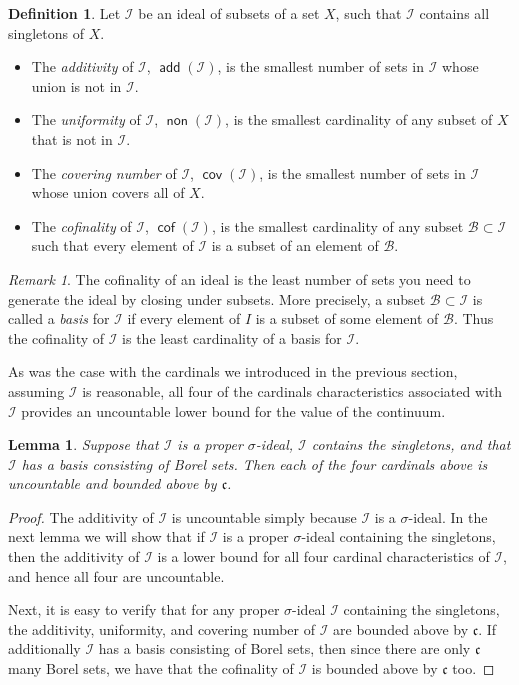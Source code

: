 \documentclass[11pt,oneside]{amsbook}
\DeclareMathOperator{\add}{\mathsf{add}}
\DeclareMathOperator{\non}{\mathsf{non}}
\DeclareMathOperator{\cov}{\mathsf{cov}}
\DeclareMathOperator{\cof}{\mathsf{cof}}
\theoremstyle{definition}
\theoremstyle{plain}
\newtheorem{lem}[thm]{Lemma}
\theoremstyle{definition}
\newtheorem{defn}[thm]{Definition}
\theoremstyle{remark}
\newtheorem{rem}[thm]{Remark}
\numberwithin{equation}{section}
\numberwithin{figure}{section}
\begin{document}
\begin{defn} Let $\mathcal I$ be an ideal of subsets of a set $X$, such that $\mathcal I$ contains all singletons of $X$. 
  \begin{itemize}
  \item The \emph{additivity} of $\mathcal{I}$, $\add(\mathcal{I})$, is the smallest number of sets in $\mathcal{I}$ whose union is not in $\mathcal{I}$.
  \item The \emph{uniformity} of $\mathcal{I}$, $\non(\mathcal{I})$, is the smallest cardinality of any subset of $X$ that is not in $\mathcal{I}$.
  \item The \emph{covering number} of $\mathcal{I}$, $\cov(\mathcal{I})$, is the smallest number of sets in $\mathcal{I}$ whose union covers all of $X$.
  \item The \emph{cofinality} of $\mathcal{I}$, $\cof(\mathcal{I})$, is the smallest cardinality of any subset $\mathcal{B}\subset\mathcal{I}$ such that every element of $\mathcal{I}$ is a subset of an element of $\mathcal{B}$.
  \end{itemize}
\end{defn}

\begin{rem}
The cofinality of an ideal is the least number of sets you need to generate the ideal by closing under subsets. More precisely, a subset $\mathcal B\subset\mathcal I$ is called a \emph{basis} for $\mathcal I$ if every element of $I$ is a subset of some element of $\mathcal B$. Thus the cofinality of $\mathcal I$ is the least cardinality of a basis for $\mathcal I$.
\end{rem}

As was the case with the cardinals we introduced in the previous section, assuming $\mathcal I$ is reasonable, all four of the cardinals characteristics associated with $\mathcal I$ provides an uncountable lower bound for the value of the continuum.

\begin{lem}
  \label{lem:ideal-cards}
  Suppose that $\mathcal I$ is a proper $\sigma$-ideal, $\mathcal I$ contains the singletons, and that $\mathcal I$ has a basis consisting of Borel sets. Then each of the four cardinals above is uncountable and bounded above by $\mathfrak c$.
\end{lem}

\begin{proof}
  The additivity of $\mathcal I$ is uncountable simply because $\mathcal I$ is a $\sigma$-ideal. In the next lemma we will show that if $\mathcal I$ is a proper $\sigma$-ideal containing the singletons, then the additivity of $\mathcal I$ is a lower bound for all four cardinal characteristics of $\mathcal I$, and hence all four are uncountable.

  Next, it is easy to verify that for any proper $\sigma$-ideal $\mathcal I$ containing the singletons, the additivity, uniformity, and covering number of $\mathcal I$ are bounded above by $\mathfrak c$. If additionally $\mathcal I$ has a basis consisting of Borel sets, then since there are only $\mathfrak c$ many Borel sets, we have that the cofinality of $\mathcal I$ is bounded above by $\mathfrak c$ too.
\end{proof}
\end{document}
